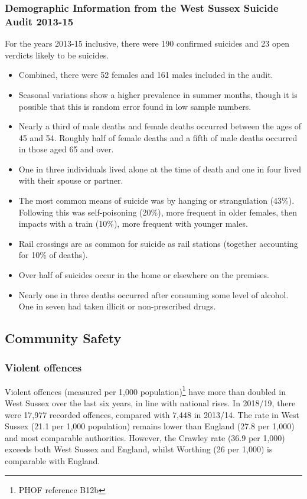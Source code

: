\subsubsection{Demographic Information from the West Sussex Suicide Audit 2013-15} For the years 2013-15 inclusive, there were 190 confirmed suicides and 23 open verdicts likely to be suicides.
\begin{itemize}[noitemsep]
    \item Combined, there were 52 females and 161 males included in the audit.
    \item Seasonal variations show a higher prevalence in summer months, though it is possible that this is random error found in low sample numbers.
    \item Nearly a third of male deaths and female deaths occurred between the ages of 45 and 54. Roughly half of female deaths and a fifth of male deaths occurred in those aged 65 and over.
    \item One in three individuals lived alone at the time of death and one in four lived with their spouse or partner.
    \item The most common means of suicide was by hanging or strangulation (43\%). Following this was self-poisoning (20\%), more frequent in older females, then impacts with a train (10\%), more frequent with younger males.
    \item Rail crossings are as common for suicide as rail stations (together accounting for 10\% of deaths).
    \item Over half of suicides occur in the home or elsewhere on the premises.
    \item Nearly one in three deaths occurred after consuming some level of alcohol. One in seven had taken illicit or non-prescribed drugs.
\end{itemize}

\subsection{Community Safety}
\subsubsection{Violent offences} Violent offences (measured per 1,000 population)\footnote{PHOF reference B12b} have more than doubled in West Sussex over the last six years, in line with national rises. In 2018/19, there were 17,977 recorded offences, compared with 7,448 in 2013/14. The rate in West Sussex (21.1 per 1,000 population) remains lower than England (27.8 per 1,000) and most comparable authorities. However, the Crawley rate (36.9 per 1,000) exceeds both West Sussex and England, whilst Worthing (26 per 1,000) is comparable with England.

